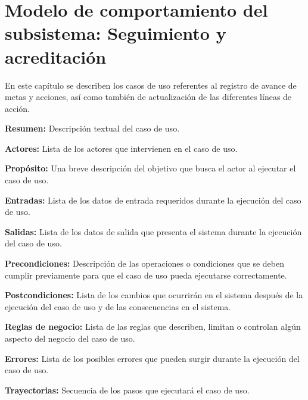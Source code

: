 \documentclass[10pt]{book}
\begin{document}

   	
\chapter{Modelo de comportamiento del subsistema: Seguimiento y acreditación \label{chp:modeloSeguimientoYAcreditacion}}
     
     En este capítulo se describen los casos de uso referentes al registro de avance de metas y acciones, así como también de actualización de las diferentes líneas de acción. \bigskip

     \begin{objetivos}
  \item {\bf Resumen:} Descripción textual del caso de uso.
  \item {\bf Actores:} Lista de los actores que intervienen en el caso de uso.
  \item {\bf Propósito:} Una breve descripción del objetivo que busca el actor al ejecutar el caso de uso.
  \item {\bf Entradas:} Lista de los datos de entrada requeridos durante la ejecución del caso de uso.
  \item {\bf Salidas:} Lista de los datos de salida que presenta el sistema durante la ejecución del caso de uso.
  \item {\bf Precondiciones:} Descripción de las operaciones o condiciones que se deben cumplir previamente para que el caso de uso pueda ejecutarse correctamente.
  \item {\bf Postcondiciones:} Lista de los cambios que ocurrirán en el sistema después de la ejecución del caso de uso y de las consecuencias en el sistema.
  \item {\bf Reglas de negocio:} Lista de las reglas que describen, limitan o controlan algún aspecto del negocio del caso de uso.
  \item {\bf Errores:} Lista de los posibles errores que pueden surgir durante la ejecución del caso de uso.
  \item {\bf Trayectorias:} Secuencia de los pasos que ejecutará el caso de uso.
    \end{objetivos}     
    
\end{document}
